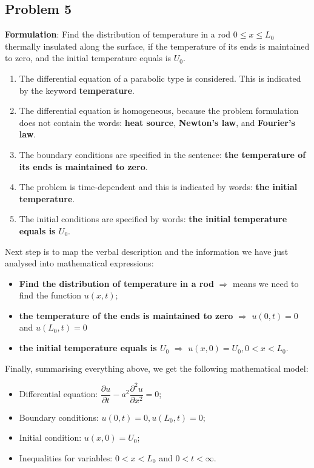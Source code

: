 \subsection{Problem 5}

{\bfseries Formulation}: Find the distribution of temperature in a rod $0\leq x\leq L_{0}$ thermally insulated along the surface, if the temperature of its ends is maintained to zero, and the initial temperature equals is $U_{0}$.
\begin{enumerate}
\item The differential equation of a parabolic type is considered. This is indicated by the keyword {\bfseries temperature}.
\item The differential equation is homogeneous, because the problem formulation does not contain the words: {\bfseries heat source}, {\bfseries Newton's law}, and {\bfseries Fourier's law}.
\item The boundary conditions are specified in the sentence: {\bfseries the temperature of its ends is maintained to zero}.
\item The problem is time-dependent and this is indicated by words: {\bfseries the initial temperature}.
\item The initial conditions are specified by words: {\bfseries the initial temperature equals is $U_{0}$}.
\end{enumerate}
Next step is to map the verbal description and the information we have just analysed into mathematical expressions:
\begin{itemize}
\item {\bfseries Find the distribution of temperature in a rod} $\Longrightarrow$ means we need to find the function $u(x,t)$;
\item {\bfseries the temperature of the ends is maintained to zero} $\Longrightarrow$ $u(0,t)=0$ and $u(L_{0},t)=0$
\item {\bfseries the initial temperature equals is $U_{0}$} $\Longrightarrow$ $u(x,0)=U_{0}, 0<x<L_{0}$.
\end{itemize}
Finally, summarising everything above, we get the following mathematical model:
\begin{itemize}
\item Differential equation: $\dfrac{\partial u}{\partial t} - a^{2}\dfrac{\partial^{2} u}{\partial x^{2}}=0$;
\item Boundary conditions: $u(0,t)=0, u(L_{0},t)=0$;
\item Initial condition: $u(x,0)=U_{0}$;
\item Inequalities for variables: $0<x<L_{0}$ and $0<t<\infty$.
\end{itemize}

